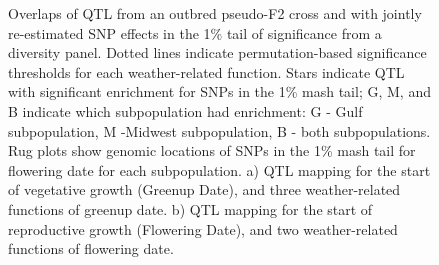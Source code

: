 \documentclass[
  9pt,
  twocolumn,
  twoside]{pnas-new}
\begin{document}
\begin{figure}


\caption{\label{fig-qtl}Overlaps of QTL from an outbred pseudo-F2 cross
and with jointly re-estimated SNP effects in the 1\% tail of
significance from a diversity panel. Dotted lines indicate
permutation-based significance thresholds for each weather-related
function. Stars indicate QTL with significant enrichment for SNPs in the
1\% mash tail; G, M, and B indicate which subpopulation had enrichment:
G - Gulf subpopulation, M -Midwest subpopulation, B - both
subpopulations. Rug plots show genomic locations of SNPs in the 1\% mash
tail for flowering date for each subpopulation. a) QTL mapping for the
start of vegetative growth (Greenup Date), and three weather-related
functions of greenup date. b) QTL mapping for the start of reproductive
growth (Flowering Date), and two weather-related functions of flowering
date.}

\end{figure}%
\end{document}
